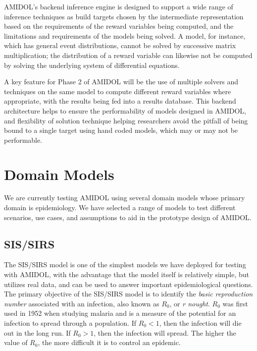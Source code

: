 \documentclass[11pt]{article}
\newcommand{\amidol}{\textsc{AMIDOL}}
\begin{document}
\amidol{}'s backend inference engine is designed to support a wide range of inference techniques as build targets chosen by the intermediate representation based on the requirements of the reward variables being computed, and the limitations and requirements of the models being solved.  A model, for instance, which has general event distributions, cannot be solved by successive matrix multiplication; the distribution of a reward variable can likewise not be computed by solving the underlying system of differential equations.

A key feature for Phase 2 of \amidol{} will be the use of multiple solvers and techniques on the same model to compute different reward variables where appropriate, with the results being fed into a results database.  This  backend architecture helps to ensure the performability of models designed in \amidol{}, and flexibility of solution technique helping researchers avoid the pitfall of being bound to a single target using hand coded models, which may or may not be performable.


\section{Domain Models}

We are currently testing \amidol{} using several domain models whose primary domain is epidemiology.  We have selected a range of models to test different scenarios, use cases, and assumptions to aid in the prototype design of \amidol{}.

\subsection{SIS/SIRS}

The SIS/SIRS model is one of the simplest models we have deployed for testing with \amidol{}, with the advantage that the model itself is relatively simple, but utilizes real data, and can be used to answer important epidemiological questions.  The primary objective of the SIS/SIRS model is to identify the \emph{basic reproduction number} associated with an infection, also known as $R_0$, or \emph{r nought}.  $R_0$ was first used in 1952 when studying malaria and is a measure of the potential for an infection to spread through a population.  If $R_0 < 1$, then the infection will die out in the long run.  If $R_0 > 1$, then the infection will spread.  The higher the value of $R_0$, the more difficult it is to control an epidemic.
\end{document}
